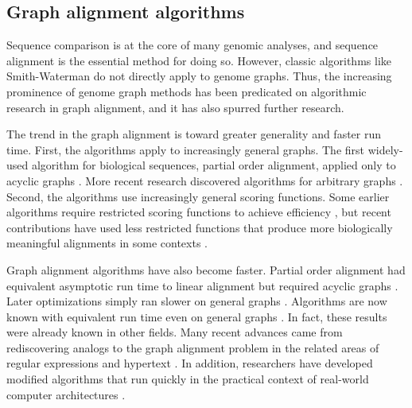 %

\subsection{Graph alignment algorithms}

Sequence comparison is at the core of many genomic analyses, and sequence alignment is the essential method for doing so. 
However, classic algorithms like Smith-Waterman \cite{Smith_1981} do not directly apply to genome graphs. 
Thus, the increasing prominence of genome graph methods has been predicated on algorithmic research in graph alignment, and it has also spurred further research.

The trend in the graph alignment is toward greater generality and faster run time. 
First, the algorithms apply to increasingly general graphs. 
The first widely-used algorithm for biological sequences, partial order alignment, applied only to acyclic graphs \cite{Lee_2002, Grasso_2004}. 
More recent research discovered algorithms for arbitrary graphs \cite{Antipov_2015, Rautiainen_2017, Jain_2019a}. 
Second, the algorithms use increasingly general scoring functions. 
Some earlier algorithms require restricted scoring functions to achieve efficiency \cite{Rautiainen_2017}, but recent contributions have used less restricted functions that produce more biologically meaningful alignments in some contexts \cite{Jain_2019a}.

Graph alignment algorithms have also become faster.
Partial order alignment had equivalent asymptotic run time to linear alignment but required acyclic graphs \cite{Lee_2002}. 
Later optimizations simply ran slower on general graphs \cite{Kavya_2019}.
Algorithms are now known with equivalent run time even on general graphs \cite{Jain_2019a}.
In fact, these results were already known in other fields.
Many recent advances came from rediscovering analogs to the graph alignment problem in the related areas of regular expressions and hypertext \cite{Myers_1989, Amir_1997, Navarro_2000}. %
In addition, researchers have developed modified algorithms that run quickly in the practical context of real-world computer architectures \cite{Suzuki_2018, Rautiainen_2019, Jain_2019b}.

